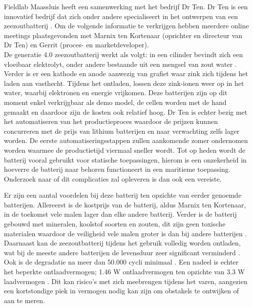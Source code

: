 Fieldlab Maassluis heeft een samenwerking met het bedrijf Dr Ten. Dr Ten is een innovatief bedrijf dat zich onder andere specialiseert in het ontwerpen van een zeezoutbatterij \cite{drten_zeezout_batterij2}. Om de volgende informatie te verkrijgen hebben meerdere online meetings plaatsgevonden met Marnix ten Kortenaar (oprichter en directeur van Dr Ten) en Gerrit (proces- en marketdeveloper). \\

\noindent De generatie 4.0 zeezoutbatterij werkt als volgt: in een cilinder bevindt zich een vloeibaar elektrolyt, onder andere bestaande uit een mengsel van zout water \cite{kouwenberg2023}. Verder is er een kathode en anode aanwezig van grafiet waar zink zich tijdens het laden aan vasthecht. Tijdens het ontladen, lossen deze zink-ionen weer op in het water, waarbij elektronen en energie vrijkomen. Deze batterijen zijn op dit moment enkel verkrijgbaar als demo model, de cellen worden met de hand gemaakt en daardoor zijn de kosten ook relatief hoog. Dr Ten is echter bezig met het automatiseren van het productieproces waardoor de prijzen kunnen concurreren met de prijs van lithium batterijen en naar verwachting zelfs lager worden. De eerste automatiseringsstappen zullen aankomende zomer ondernomen worden waarmee de productietijd viermaal sneller wordt. Tot op heden wordt de batterij vooral gebruikt voor statische toepassingen, hierom is een onzekerheid in hoeverre de batterij naar behoren functioneert in een maritieme toepassing. Onderzoek naar of dit complicaties zal opleveren is dan ook een vereiste.

\noindent Er zijn een aantal voordelen bij deze batterij ten opzichte van eerder genoemde batterijen. Allereerst is de kostprijs van de batterij, aldus Marnix ten Kortenaar, in de toekomst vele malen lager dan elke andere batterij. Verder is de batterij gebouwd met mineralen, koolstof soorten en zouten, dit zijn geen toxische materialen waardoor de veiligheid vele malen groter is dan bij andere batterijen \cite{DrTen1}. Daarnaast kan de zeezoutbatterij tijdens het gebruik volledig worden ontladen, wat bij de meeste andere batterijen de levensduur zeer significant verminderd \cite{DrTen1}. Ook is de degradatie na meer dan 50.000 cycli minimaal \cite{JIPBatteryMaassluis} \label{zeezout50000}. Een nadeel is echter het beperkte ontlaadvermogen; 1.46 W ontlaadvermogen ten opzichte van 3.3 W laadvermogen \cite{JIPBatteryMaassluis}. Dit kan risico's met zich meebrengen tijdens het varen, aangezien een kortstondige piek in vermogen nodig kan zijn om obstakels te ontwijken of aan te meren. \\

